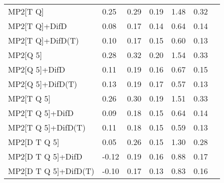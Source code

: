 \begin{table}
\begin{tabular}{l l l l l l l }
    MP2[T Q] & 0.25 & 0.29 & 0.19 & 1.48 & 0.32 \\ 
    MP2[T Q]+DifD & 0.08 & 0.17 & 0.14 & 0.64 & 0.14 \\ 
    MP2[T Q]+DifD(T) & 0.10 & 0.17 & 0.15 & 0.60 & 0.13 \\ 
    MP2[Q 5] & 0.28 & 0.32 & 0.20 & 1.54 & 0.33 \\ 
    MP2[Q 5]+DifD & 0.11 & 0.19 & 0.16 & 0.67 & 0.15 \\ 
    MP2[Q 5]+DifD(T) & 0.13 & 0.19 & 0.17 & 0.57 & 0.13 \\ 
    MP2[T Q 5] & 0.26 & 0.30 & 0.19 & 1.51 & 0.33 \\ 
    MP2[T Q 5]+DifD & 0.09 & 0.18 & 0.15 & 0.64 & 0.14 \\ 
    MP2[T Q 5]+DifD(T) & 0.11 & 0.18 & 0.15 & 0.59 & 0.13 \\ 
    MP2[D T Q 5] & 0.05 & 0.26 & 0.15 & 1.30 & 0.28 \\ 
    MP2[D T Q 5]+DifD & -0.12 & 0.19 & 0.16 & 0.88 & 0.17 \\ 
    MP2[D T Q 5]+DifD(T) & -0.10 & 0.17 & 0.13 & 0.83 & 0.16 \\ 
    \bottomrule
  \end{tabular}
\end{table}
